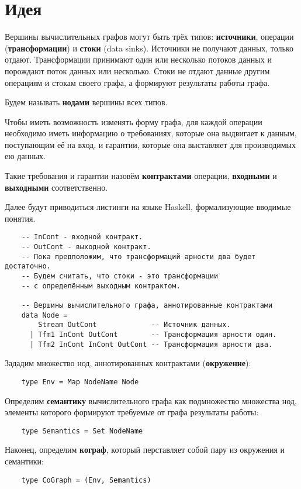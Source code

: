 \section{Идея}

Вершины вычислительных графов могут быть трёх типов: \textbf{источники}, операции (\textbf{трансформации}) и \textbf{стоки} (data sinks). Источники не получают данных, только отдают. Трансформации принимают один или несколько потоков данных и порождают поток данных или несколько. Стоки не отдают данные другим операциям и стокам своего графа, а формируют результаты работы графа.

Будем называть \textbf{нодами} вершины всех типов.

Чтобы иметь возможность изменять форму графа, для каждой операции необходимо иметь информацию о требованиях, которые она выдвигает к данным, поступающим её на вход, и гарантии, которые она выставляет для производимых ею данных.

Такие требования и гарантии назовём \textbf{контрактами} операции, \textbf{входными} и \textbf{выходными} соответственно.

Далее будут приводиться листинги на языке Haskell, формализующие вводимые понятия.

\begin{lstlisting}
    -- InCont - входной контракт.
    -- OutCont - выходной контракт.
    -- Пока предположим, что трансформаций арности два будет достаточно.
    -- Будем считать, что стоки - это трансформации
    -- с определённым выходным контрактом.

    -- Вершины вычислительного графа, аннотированные контрактами
    data Node =
        Stream OutCont             -- Источник данных.
      | Tfm1 InCont OutCont        -- Трансформация арности один.
      | Tfm2 InCont InCont OutCont -- Трансформация арности два.
\end{lstlisting}

Зададим множество нод, аннотированных контрактами (\textbf{окружение}):
\begin{lstlisting}
    type Env = Map NodeName Node
\end{lstlisting}

Определим \textbf{семантику} вычислительного графа как подмножество множества нод, элементы которого формируют требуемые от графа результаты работы:
\begin{lstlisting}
    type Semantics = Set NodeName
\end{lstlisting}

Наконец, определим \textbf{кограф}, который перставляет собой пару из окружения и семантики:
\begin{lstlisting}
    type CoGraph = (Env, Semantics)
\end{lstlisting}

